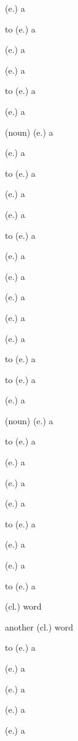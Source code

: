 \begin{glosses}
\par {} (e.) {a}
\par to  (e.) {a}
\par {} (e.) {a}
\par {} (e.) {a}
\end{glosses}

\begin{glosses}
\par to  (e.) {a}
\par {} (e.) {a}
\par {} (noun) (e.) {a}
\par {} (e.) {a}
\par to  (e.) {a}
\par {} (e.) {a}
\par {} (e.) {a}
\par to  (e.) {a}
\par {} (e.) {a}
\par {} (e.) {a}
\par {} (e.) {a}
\par {} (e.) {a}
\par {} (e.) {a}
\par to  (e.) {a}
\par to  (e.) {a}
\par {} (e.) {a}
\par {} (noun) (e.) {a}
\par to  (e.) {a}
\par {} (e.) {a}
\par {} (e.) {a}
\par {} (e.) {a}
\par to  (e.) {a}
\par {} (e.) {a}
\par {} (e.) {a}
\end{glosses}

\begin{glosses}
\par to  (e.) {a}
\par {} (cl.) {word}
\par another  (cl.) {word}
\par to  (e.) {a}
\par {} (e.) {a}
\par {} (e.) {a}
\par {} (e.) {a}
\par {} (e.) {a}
\end{glosses}


